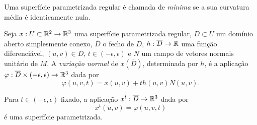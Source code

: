 
\begin{definicao}
	Uma superfície parametrizada regular é chamada de \emph{mínima} se a sua curvatura média é identicamente nula.
\end{definicao}

\begin{definicao}
	Seja
	$x: U \subset \mathbb R^2 \rightarrow \mathbb R^3$ uma superfície parametrizada regular,
	$D \subset U$ um domínio aberto simplesmente conexo,
	$\overline{D}$ o fecho de $D$,
	$h: \overline{D} \rightarrow \mathbb R$ uma função diferenciável,
	$(u,v) \in \overline{D}$,
	$t \in (-\epsilon,\epsilon)$ e
	$N$ um campo de vetores normais unitário de $M$.
	A \emph{variação normal} de $x(\overline{D})$, determinada por $h$, é a aplicação $\varphi: \overline{D} \times (-\epsilon, \epsilon) \rightarrow \mathbb R^3$ dada por
	\begin{equation*}
		 \varphi(u,v,t) = x(u,v) + t h(u,v) N(u,v).
	\end{equation*}
\end{definicao}
Para $t \in (-\epsilon,\epsilon)$ fixado, a aplicação $x^t: \overline{D} \rightarrow \mathbb R^3$ dada por
\begin{equation}
	x^t(u,v) = \varphi(u,v,t)
\end{equation}
é uma superfície parametrizada.

